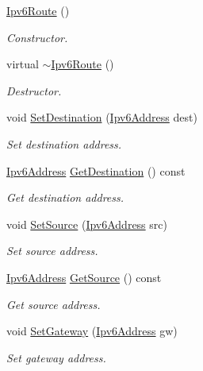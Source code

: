 \begin{DoxyCompactItemize}
\item 
\hyperlink{classns3_1_1Ipv6Route_ac2c6d1c27e97ecbad9da64e0c8b80516}{Ipv6\+Route} ()
\begin{DoxyCompactList}\small\item\em Constructor. \end{DoxyCompactList}\item 
virtual \hyperlink{classns3_1_1Ipv6Route_a374ce34125ee8555236f42751976785e}{$\sim$\+Ipv6\+Route} ()
\begin{DoxyCompactList}\small\item\em Destructor. \end{DoxyCompactList}\item 
void \hyperlink{classns3_1_1Ipv6Route_a6c0c6f15bd4258295feb3532c3e54730}{Set\+Destination} (\hyperlink{classns3_1_1Ipv6Address}{Ipv6\+Address} dest)
\begin{DoxyCompactList}\small\item\em Set destination address. \end{DoxyCompactList}\item 
\hyperlink{classns3_1_1Ipv6Address}{Ipv6\+Address} \hyperlink{classns3_1_1Ipv6Route_a36f2c986c1ee8b3d31e7f2230137a1cb}{Get\+Destination} () const 
\begin{DoxyCompactList}\small\item\em Get destination address. \end{DoxyCompactList}\item 
void \hyperlink{classns3_1_1Ipv6Route_a1663dc55529a6df22267c445447120fd}{Set\+Source} (\hyperlink{classns3_1_1Ipv6Address}{Ipv6\+Address} src)
\begin{DoxyCompactList}\small\item\em Set source address. \end{DoxyCompactList}\item 
\hyperlink{classns3_1_1Ipv6Address}{Ipv6\+Address} \hyperlink{classns3_1_1Ipv6Route_a66df5871f1e38dbc1ace364d0523a9f4}{Get\+Source} () const 
\begin{DoxyCompactList}\small\item\em Get source address. \end{DoxyCompactList}\item 
void \hyperlink{classns3_1_1Ipv6Route_a15f2ae58b93a1d3f8860f07a9bd203df}{Set\+Gateway} (\hyperlink{classns3_1_1Ipv6Address}{Ipv6\+Address} gw)
\begin{DoxyCompactList}\small\item\em Set gateway address. \end{DoxyCompactList}\item 

\end{DoxyCompactItemize}
